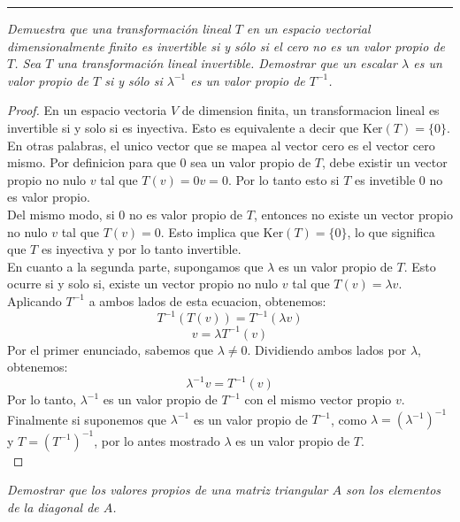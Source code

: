 \documentclass[11pt]{article}
\begin{document}
\rule{17cm}{0.1mm}

\begin{tcolorbox}[title = \textcolor{black}{\textcolor{white}{Problema 1}}]
\textit{
Demuestra que una transformación lineal \( T \) en un espacio vectorial dimensionalmente finito es invertible si y sólo si el cero no es un valor propio de \( T \).
Sea \( T \) una transformación lineal invertible. Demostrar que un escalar \( \lambda \) es un valor propio de \( T \) si y sólo si \( \lambda^{-1} \) es un valor propio de \( T^{-1} \).
}
\end{tcolorbox}
\begin{proof}
    En un espacio vectoria \(V\) de dimension finita, un transformacion lineal es invertible si y solo si es inyectiva. 
    Esto es equivalente a decir que \(\text{Ker}(T) = \{0\}\). En otras palabras, el unico vector que se mapea al vector cero es el vector cero mismo.
    Por definicion para que \( 0 \) sea un valor propio de \( T \), debe existir un vector propio no nulo \( v \) tal que \( T(v) = 0v = 0 \). 
    Por lo tanto esto si \(T \) es invetible \( 0\) no es valor propio.\\
    Del mismo modo, si \( 0 \) no es valor propio de \( T \), entonces no existe un vector propio no nulo \( v \) tal que \( T(v) = 0 \).
    Esto implica que \( \text{Ker}(T) = \{0\} \), lo que significa que \( T \) es inyectiva y por lo tanto invertible.\\[10pt]

    En cuanto a la segunda parte, supongamos que \( \lambda \) es un valor propio de \( T \). Esto ocurre si y solo si, existe un vector propio no nulo \( v \) tal que \( T(v) = \lambda v \).
    Aplicando \( T^{-1} \) a ambos lados de esta ecuacion, obtenemos:
    \[ T^{-1}(T(v)) = T^{-1}(\lambda v) \]
    \[ v = \lambda T^{-1}(v) \]
    Por el primer enunciado, sabemos que \( \lambda \neq 0 \). Dividiendo ambos lados por \( \lambda \), obtenemos:
    \[ \lambda^{-1}v = T^{-1}(v) \]
    Por lo tanto, \( \lambda^{-1} \) es un valor propio de \( T^{-1} \) con el mismo vector propio \( v \). 
    Finalmente si suponemos que \( \lambda^{-1}\) es un valor propio de \( T^{-1} \), como \( \lambda= (\lambda^{-1})^{-1}  \) y \( T= (T^{-1})^{-1} \), por lo antes mostrado 
    \( \lambda \) es un valor propio de \( T \). \\
\end{proof}
\newpage
\begin{tcolorbox}[title = \textcolor{black}{\textcolor{white}{Problema 2}}]
\textit{
Demostrar que los valores propios de una matriz triangular \( A \) son los elementos de la diagonal de \( A \).
}
\end{tcolorbox}
\end{document}
